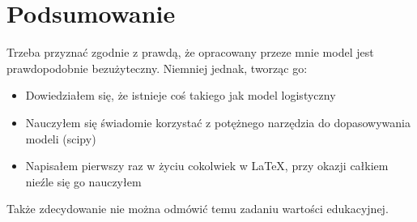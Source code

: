 \documentclass{article}
\begin{document}
\section{Podsumowanie}
Trzeba przyznać zgodnie z prawdą, że opracowany przeze mnie model jest prawdopodobnie bezużyteczny. Niemniej jednak, tworząc go:
\begin{itemize}
    \item Dowiedziałem się, że istnieje coś takiego jak model logistyczny
    \item Nauczyłem się świadomie korzystać z potężnego narzędzia do dopasowywania modeli (scipy)
    \item Napisałem pierwszy raz w życiu cokolwiek w \LaTeX, przy okazji całkiem nieźle się go nauczyłem
    
\end{itemize}
Także zdecydowanie nie można odmówić temu zadaniu wartości edukacyjnej.
\end{document}
